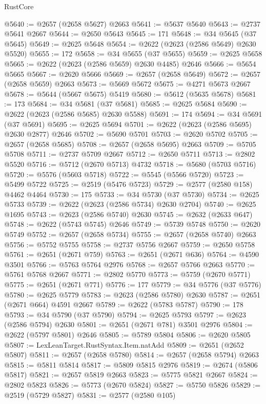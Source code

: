 \begin{lexlean}{RustCore}
\begin{coremodule}
@5640 := @2657 (@2658 @5627) @2663
@5641 := @5637 @5640
@5643 := @2737 @5641 @2667
@5644 := @2650 @5643
@5645 := 171
@5648 := @34 @5645 (@37 @5645)
@5649 := @2625 @5648
@5654 := @2622 (@2623 (@2586 @5649) @2630 @5520)
@5655 := 172
@5658 := @34 @5655 (@37 @5655)
@5659 := @2625 @5658
@5665 := @2622 (@2623 (@2586 @5659) @2630 @4485) @2646
@5666 := @5654 @5665
@5667 := @2620 @5666
@5669 := @2657 (@2658 @5649)
@5672 := @2657 (@2658 @5659) @2663
@5673 := @5669 @5672
@5675 := @4271 @5673 @2667
@5678 := @5644 (@5667 @5675) @5419
@5680 := @5612 (@5635 @5678)
@5681 := 173
@5684 := @34 @5681 (@37 @5681)
@5685 := @2625 @5684
@5690 := @2622 (@2623 (@2586 @5685) @2630 @5588)
@5691 := 174
@5694 := @34 @5691 (@37 @5691)
@5695 := @2625 @5694
@5701 := @2622 (@2623 (@2586 @5695) @2630 @2877) @2646
@5702 := @5690 @5701
@5703 := @2620 @5702
@5705 := @2657 (@2658 @5685)
@5708 := @2657 (@2658 @5695) @2663
@5709 := @5705 @5708
@5711 := @2737 @5709 @2667
@5712 := @2650 @5711
@5713 := @2802 @5520
@5716 := @5712 (@2670 @5713) @4732
@5718 := @5680 (@5703 @5716)
@5720 := @5576 (@5603 @5718)
@5722 := @5545 (@5566 @5720)
@5723 := @5499 @5722
@5725 := @2519 (@5476 @5723)
@5729 := @2577 (@2580 @158) @4462 @4464
@5730 := 175
@5733 := @34 @5730 (@37 @5730)
@5734 := @2625 @5733
@5739 := @2622 (@2623 (@2586 @5734) @2630 @2704)
@5740 := @2625 @1695
@5743 := @2623 (@2586 @5740) @2630
@5745 := @2632 (@2633 @647)
@5748 := @2622 (@5743 @5745) @2646
@5749 := @5739 @5748
@5750 := @2620 @5749
@5752 := @2657 (@2658 @5734)
@5755 := @2657 (@2658 @5740) @2663
@5756 := @5752 @5755
@5758 := @2737 @5756 @2667
@5759 := @2650 @5758
@5761 := @2651 (@2671 @759)
@5763 := @2651 (@2671 @636)
@5764 := @4590 @3501
@5766 := @5763 @5764 @2976
@5768 := @2657 @5766 @2663
@5770 := @5761 @5768 @2667
@5771 := @2802 @5770
@5773 := @5759 (@2670 @5771)
@5775 := @2651 (@2671 @771)
@5776 := 177
@5779 := @34 @5776 (@37 @5776)
@5780 := @2625 @5779
@5783 := @2623 (@2586 @5780) @2630
@5787 := @2651 (@2671 @664) @4591 @2667
@5789 := @2622 (@5783 @5787)
@5790 := 178
@5793 := @34 @5790 (@37 @5790)
@5794 := @2625 @5793
@5797 := @2623 (@2586 @5794) @2630
@5801 := @2651 (@2671 @781) @3501 @2976
@5804 := @2622 (@5797 @5801) @2646
@5805 := @5789 @5804
@5806 := @2620 @5805
@5807 := LexLeanTarget.RustSyntax.Item.natAdd
@5809 := @2651 (@2652 @5807)
@5811 := @2657 (@2658 @5780)
@5814 := @2657 (@2658 @5794) @2663
@5815 := @5811 @5814
@5817 := @5809 @5815 @2976
@5819 := @2674 (@5806 @5817)
@5821 := @2657 @5819 @2663
@5823 := @5775 @5821 @2667
@5824 := @2802 @5823
@5826 := @5773 (@2670 @5824)
@5827 := @5750 @5826
@5829 := @2519 (@5729 @5827)
@5831 := @2577 (@2580 @105)

\end{coremodule}
\end{lexlean}
